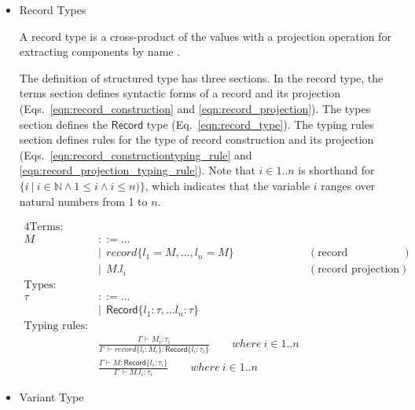 \documentclass[preprint,3p,onecolumn,times,review]{elsarticle}
\begin{document}
\begin{itemize}
\item Record Types

  A record type is a cross-product of the values with a projection operation for extracting components by name \cite[p.18]{cardelli04:_type_system,pierce02:_types_progr_languag}.

  The definition of structured type has three sections. In the record type, the terms section defines syntactic forms of a record and its projection (Eqs.~\ref{eqn:record_construction} and \ref{eqn:record_projection}). The types section defines the $\mathsf{Record}$ type (Eq.~\ref{eqn:record_type}). The typing rules section defines rules for the type of record construction and its projection (Eqs.~\ref{eqn:record_constructiontyping_rule} and \ref{eqn:record_projection_typing_rule}). Note that $i \in 1..n$ is shorthand for $\{ i~|~ i  \in \mathbb{N} \wedge 1 \leq i \wedge i \leq n )\}$, which indicates that the variable $i$ ranges over natural numbers from 1 to $n$.

    \begin{alignat}{4}
        \text{Terms:} \qquad   \nonumber\\
        M~ & {::= \dots }\nonumber\\
           & | ~~ record\{l_1 = M,\dots,l_n = M \} & (\text{record construction}) \label{eqn:record_construction}\\
           & | ~~M.l_i    & (\text{record projection}) \label{eqn:record_projection}\\
        \text{Types:} \qquad   \nonumber\\
        \tau~  & {::= \dots}\nonumber\\
               &  |~~ \mathsf{Record}\{l_1 : \tau, \dots l_n : \tau \} \label{eqn:record_type}\\
        \text{Typing rules:} \qquad   \nonumber\\
        & \frac{\Gamma \vdash M_i:\tau_i}
               {\Gamma ~ \vdash record\{l_i: M_i\}: \mathsf{Record}\{l_i : \tau_i\}} \qquad where~i \in 1..n \label{eqn:record_constructiontyping_rule} \\[6pt]
        & \frac{\Gamma \vdash M : \mathsf{Record}\{l_i : \tau_i\}}
               {\Gamma ~ \vdash M.l_i : \tau_i} \qquad where~i \in 1..n \label{eqn:record_projection_typing_rule}
     \end{alignat}
   
\item Variant Type
  

\end{itemize}
\end{document}
